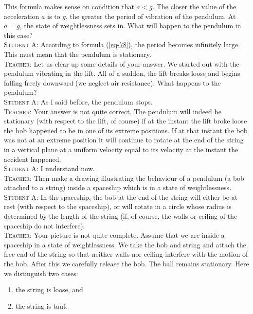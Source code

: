 \documentclass[a4paper,sfsidenotes]{tufte-book}
\begin{document}
This formula makes sense on condition that $a<g$. The closer the value of the acceleration $a$ is to $g$, the greater the period of vibration of the pendulum. At $a=g$, the state of weightlessness sets in. What will happen to the pendulum in this case?
\\
\textsc{Student A:} According to formula (\ref{eq-78}), the period becomes infinitely large. This must mean that the pendulum is stationary.
\\
\textsc{Teacher:} Let us clear up some details of your answer. We started out with the pendulum vibrating in the lift. All of a sudden, the lift breaks loose and begins falling freely downward (we neglect air resistance). What happens to the pendulum?
\\
\textsc{Student A:} As I said before, the pendulum stops.
\\
\textsc{Teacher:} Your answer is not quite correct. The pendulum will indeed be stationary (with respect to the lift, of course) if at the instant the lift broke loose the bob happened to be in one of its extreme positions. If at that instant the bob was not at an extreme position it will continue to rotate at the
end of the string in a vertical plane at a uniform velocity equal to its velocity at the instant the accident happened.
\\
\textsc{Student A:} I understand now.
\\
\textsc{Teacher:} Then make a drawing illustrating the behaviour of a pendulum (a bob attached to a string) inside a spaceship which is in a state of weightlessness.
\\
\textsc{Student A:} In the spaceship, the bob at the end of the string will either be at rest (with respect to the spaceship), or will rotate in a circle whose radius is determined by the length of the string (if, of course, the walls or ceiling of the spaceship do not interfere).
\\
\textsc{Teacher:} Your picture is not quite complete. Assume that  we are inside a spaceship in a state of weightlessness. We take the bob and string and attach the free end of the string so that neither walls nor ceiling interfere with the motion of the bob. After this we carefully release the bob. The ball remains stationary. Here we distinguish two cases: \\
\begin{enumerate}[label=(\arabic*)]
\item the string is loose, and 
\item the string is taut. 
\end{enumerate}
\end{document}
